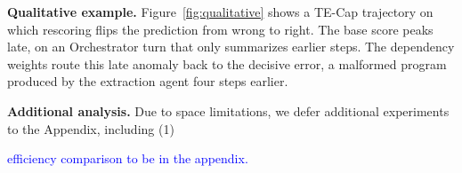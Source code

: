 \textbf{Qualitative example.} Figure~\ref{fig:qualitative} shows a TE-Cap trajectory on which rescoring flips the prediction from wrong to right. The base score peaks late, on an Orchestrator turn that only summarizes earlier steps. The dependency weights route this late anomaly back to the decisive error, a malformed program produced by the extraction agent four steps earlier.



\textbf{Additional analysis.} Due to space limitations, we defer additional experiments to the Appendix, including (1)

\textcolor{blue}{efficiency comparison to be in the appendix.}




